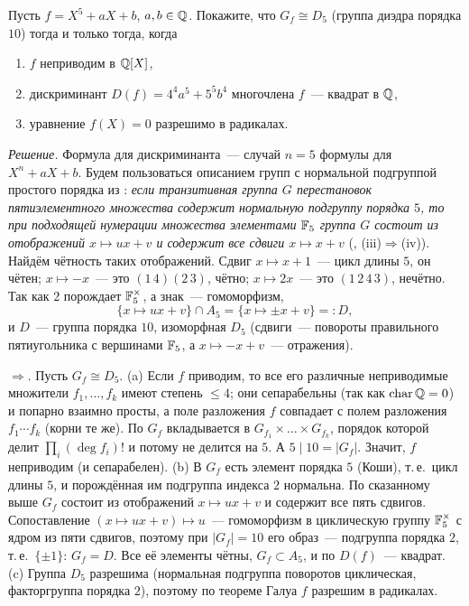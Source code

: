 \begin{exercise}[4-7]
Пусть $f=X^5+aX+b$, $a,b\in\mathbb Q$. Покажите, что $G_f\cong D_5$ \textup(группа диэдра порядка $10$\textup) тогда и только тогда, когда
\begin{enumerate}[label=(\alph*)]
\item $f$ неприводим в $\mathbb Q[X]$,
\item дискриминант $D(f)=4^4a^5+5^5b^4$ многочлена $f$~--- квадрат в $\mathbb Q$,
\item уравнение $f(X)=0$ разрешимо в радикалах.
\end{enumerate}
\end{exercise}

\noindent\emph{Решение.} Формула для дискриминанта~--- случай $n=5$ формулы  для $X^n+aX+b$. Будем пользоваться
описанием групп с нормальной подгруппой простого порядка из : \emph{если транзитивная группа $G$ перестановок
пятиэлементного множества содержит нормальную подгруппу порядка $5$, то при подходящей нумерации множества элементами
$\mathbb F_5$ группа $G$ состоит из отображений $x\mapsto ux+v$ и содержит все сдвиги $x\mapsto x+v$} (, (iii)$\Rightarrow$(iv)).
Найдём чётность таких отображений. Сдвиг $x\mapsto x+1$~--- цикл длины $5$, он чётен; $x\mapsto-x$~--- это $(1\,4)(2\,3)$,
чётно; $x\mapsto2x$~--- это $(1\,2\,4\,3)$, нечётно. Так как $2$ порождает $\mathbb F_5^\times$, а знак~--- гомоморфизм,
\[
\{x\mapsto ux+v\}\cap A_5=\{x\mapsto\pm x+v\}=:D,
\]
и $D$~--- группа порядка $10$, изоморфная $D_5$ (сдвиги~--- повороты правильного пятиугольника с вершинами $\mathbb F_5$, а
$x\mapsto-x+v$~--- отражения).

$\Rightarrow$. Пусть $G_f\cong D_5$. (a) Если $f$ приводим, то все его различные неприводимые множители $f_1,\dots,f_k$ имеют
степень $\le4$; они сепарабельны (так как $\operatorname{char}\mathbb Q=0$) и попарно взаимно просты, а поле разложения $f$
совпадает с полем разложения $f_1\cdots f_k$ (корни те же). По  $G_f$ вкладывается в $G_{f_1}\times\dots\times G_{f_k}$,
порядок которой делит $\prod_i(\deg f_i)!$ и потому не делится на $5$. А $5\mid10=|G_f|$. Значит, $f$ неприводим (и
сепарабелен). (b) В $G_f$ есть элемент порядка $5$ (Коши), т.\,е.\ цикл длины $5$, и порождённая им подгруппа индекса $2$
нормальна. По сказанному выше $G_f$ состоит из отображений $x\mapsto ux+v$ и содержит все пять сдвигов. Сопоставление
$(x\mapsto ux+v)\mapsto u$~--- гомоморфизм в циклическую группу $\mathbb F_5^\times$ с ядром из пяти сдвигов, поэтому при $|G_f|=10$
его образ~--- подгруппа порядка $2$, т.\,е.\ $\{\pm1\}$: $G_f=D$. Все её элементы чётны, $G_f\subset A_5$, и по  $D(f)$~--- квадрат. (c) Группа $D_5$ разрешима
(нормальная подгруппа поворотов циклическая, факторгруппа порядка $2$), поэтому по теореме Галуа  $f$ разрешим в
радикалах.

